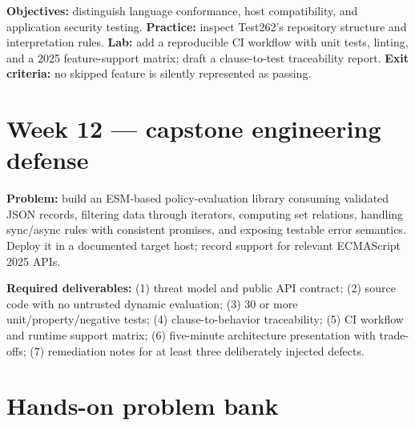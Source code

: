 \documentclass[11pt,letterpaper]{article}
\begin{document}
\textbf{Objectives:} distinguish language conformance, host compatibility, and application security testing. \textbf{Practice:} inspect Test262's repository structure and interpretation rules. \textbf{Lab:} add a reproducible CI workflow with unit tests, linting, and a 2025 feature-support matrix; draft a clause-to-test traceability report. \textbf{Exit criteria:} no skipped feature is silently represented as passing.

\section{Week 12 --- capstone engineering defense}\label{week-12-capstone-engineering-defense}

\textbf{Problem:} build an ESM-based policy-evaluation library consuming validated JSON records, filtering data through iterators, computing set relations, handling sync/async rules with consistent promises, and exposing testable error semantics. Deploy it in a documented target host; record support for relevant ECMAScript 2025 APIs.

\textbf{Required deliverables:} (1) threat model and public API contract; (2) source code with no untrusted dynamic evaluation; (3) 30 or more unit/property/negative tests; (4) clause-to-behavior traceability; (5) CI workflow and runtime support matrix; (6) five-minute architecture presentation with trade-offs; (7) remediation notes for at least three deliberately injected defects.

\section{Hands-on problem bank}\label{hands-on-problem-bank}
\end{document}
